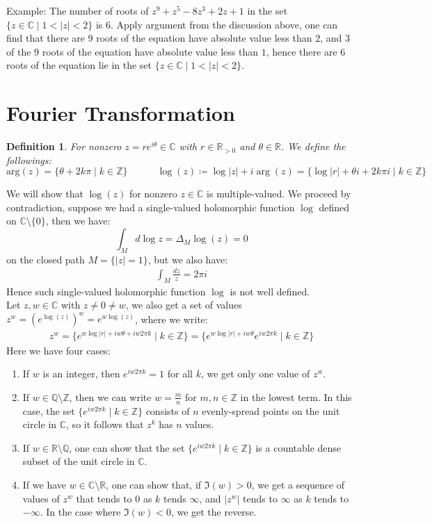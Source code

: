 \documentclass[15pt]{book}
\theoremstyle{break}
\theoremstyle{break}
\newtheorem{defn}{Definition}[corL]
\newcommand{\R}{\mathbb{R}}
\newcommand{\Z}{\mathbb{Z}}
\newcommand{\Q}{\mathbb{Q}}
\newcommand{\Complex}{\mathbb{C}}
\newcommand{\example}{\color{green}Example: \color{black}}
\begin{document}
\hfill\break
\example The number of roots of $z^9 + z^5 - 8z^3 + 2z +1$ in the set $\{z\in \Complex \mid 1< |z|<2\}$ is $6$. Apply argument from the discussion above, one can find that there are $9$ roots of the equation have absolute value less than $2$, and $3$ of the $9$ roots of the equation have absolute value less than $1$, hence there are $6$ roots of the equation lie in the set $\{z\in \Complex \mid 1< |z|<2\}$.


\newpage
\section[Fourier Transform]{\color{red} Fourier Transformation \color{black}}
\begin{defn}
For nonzero $z = re^{i\theta}\in \Complex$ with $r \in \R_{>0}$ and $\theta \in \R$. We define the followings:
$$\text{arg}(z) = \{ \theta +2k \pi \mid k \in \Z\}\quad\qquad 
\log(z) \coloneqq \log|z|+i \arg(z) = \{\log|r| +\theta i + 2k \pi i \mid k \in \Z\}$$
\end{defn}

We will show that $\log(z)$ for nonzero $z \in \Complex$ is multiple-valued. We proceed by contradiction, suppose we had a single-valued holomorphic function $\log$ defined on $\Complex\setminus \{0\}$, then we have: 
$$\int_{M}d\log z = \Delta_M \log(z) = 0$$ on the closed path $M= \{|z| = 1\}$, but we also have:
\begin{align*}
\int_M \frac{dz}{z} = 2\pi i
\end{align*}
Hence such single-valued holomorphic function $\log$ is not well defined.\\

Let $z,w \in \Complex$ with $z \neq 0 \neq w$, we also get a set of values $z^w = (e^{\log(z)})^{w} = e^{w \log(z)}$, where we write:
\begin{align*}
z^w = \{ e^{w \log|r| + iw \theta + i w 2\pi k} \mid k \in \Z\} = \{ e^{w\log|r| + i w \theta} e^{iw 2\pi k}\mid k \in \Z\}
\end{align*}
Here we have four cases:
\begin{enumerate}[topsep=3pt,itemsep=-1ex,partopsep=1ex,parsep=1ex]
\item If $w$ is an integer, then $e^{iw 2\pi k} = 1$ for all $k$, we get only one value of $z^w$.
\item If $w \in \Q \setminus \Z$, then we can write $w = \frac{m}{n}$ for $m,n \in \Z$ in the lowest term. In this case, the set $\{e^{iw 2\pi k}\mid k \in \Z\}$ consists of $n$ evenly-spread points on the unit circle in $\Complex$, so it follows that $z^k$ has $n$ values.
\item If $w \in \R \setminus \Q$, one can show that the set $\{e^{iw 2\pi k}\mid k \in \Z\}$ is a countable dense subset of the unit circle in $\Complex$. 
\item If we have $w \in \Complex \setminus \R$, one can show that, if $\Im(w) >0$, we get a sequence of values of $z^w$ that tends to $0$ as $k$ tends $\infty$, and $|z^w|$ tends to $\infty$ as $k$ tends to $-\infty$. In the case where $\Im(w)<0$, we get the reverse.
\end{enumerate}
\end{document}
